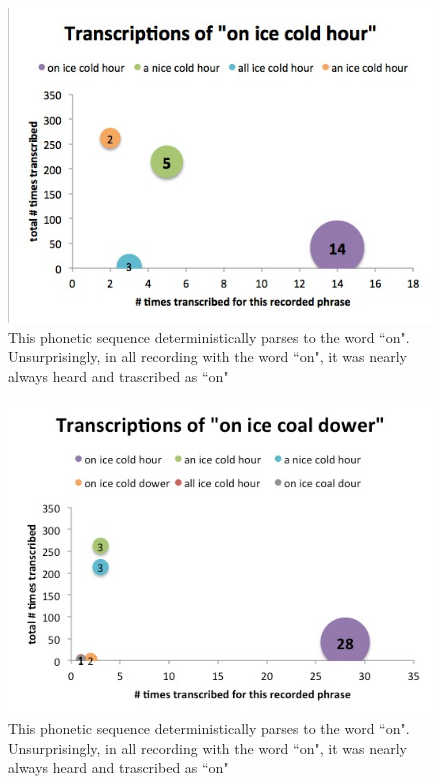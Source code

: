   
\begin{figure}[h]
\begin{center}
\includegraphics[width=\piechartwidth]{bubbleChartTranscriptionFrequency_onIceColdHour.jpg}
\captionfonts
\caption[Most common transcriptions for the recorded phrase "onIceColdHour"]{This phonetic sequence deterministically parses to the word ``on".  Unsurprisingly, in all recording with the word ``on", it was nearly always heard and trascribed as ``on"}
\label{bubbleChart:onIceColdHour}
\end{center}
\end{figure}

\begin{figure}[h]
\begin{center}
\includegraphics[width=\piechartwidth]{bubbleChartTranscriptionFrequency_onIceCoalDower.jpg}
\captionfonts
\caption[Most common transcriptions for the recorded phrase "onIceCoalDower"]{This phonetic sequence deterministically parses to the word ``on".  Unsurprisingly, in all recording with the word ``on", it was nearly always heard and trascribed as ``on"}
\label{bubbleChart:onIceCoalDower}
\end{center}
\end{figure}